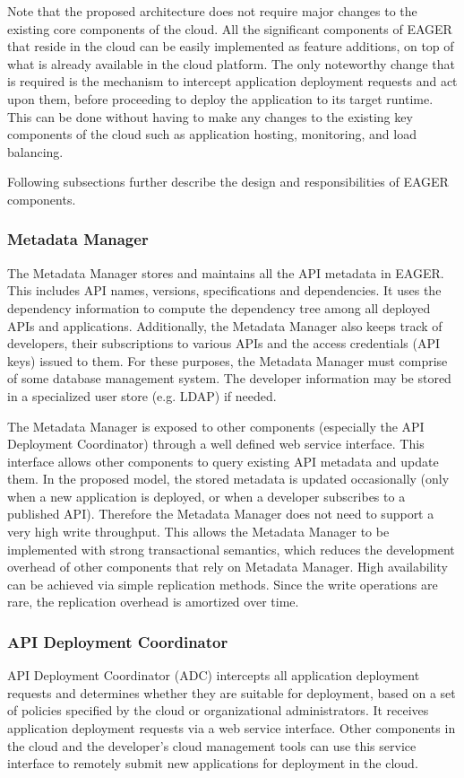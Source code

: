 Note that the proposed architecture does not require major changes to the existing core components of the cloud. All the 
significant components of EAGER that reside in the cloud can be easily implemented as feature additions, on top of what is already available 
in the cloud platform.
The only noteworthy change that is required is the mechanism to intercept application deployment requests and act upon them, before
proceeding to deploy the application to its target runtime. This can be done without having to make any changes to the existing key 
components of the cloud such as application hosting, monitoring, and load balancing.

Following subsections further describe the design and responsibilities of EAGER components.

\subsubsection{Metadata Manager}
The Metadata Manager stores and maintains all the API metadata in EAGER. This includes API names, versions, specifications and dependencies.
It uses the dependency information to compute the dependency tree among all deployed APIs and applications. Additionally, the Metadata Manager
also keeps track of developers, their subscriptions to various APIs and the access credentials (API keys) issued to them. For these purposes,
the Metadata Manager must comprise of some database management system. The developer information may be stored in a specialized user
store (e.g. LDAP) if needed.

The Metadata Manager is exposed to other components (especially the API Deployment Coordinator) through a well defined web service interface.
This interface allows other components to query existing API metadata and update them. In the proposed model, the stored metadata is updated 
occasionally (only when a new application is deployed, or when a developer subscribes to a published API). Therefore the Metadata Manager
does not need to support a very high write throughput. This allows the Metadata Manager to be implemented with strong transactional semantics,
which reduces the development overhead of other components that rely on Metadata Manager. High availability can be achieved via
simple replication methods. Since the write operations are rare, the replication overhead is amortized over time.

\subsubsection{API Deployment Coordinator}
API Deployment Coordinator (ADC) intercepts all application deployment requests and determines whether they are suitable for deployment, based
on a set of policies specified by the cloud or organizational administrators. It receives application deployment requests via a web service interface.
Other components in the cloud and the developer's cloud management tools can use this service interface to remotely submit new applications for
deployment in the cloud. 

